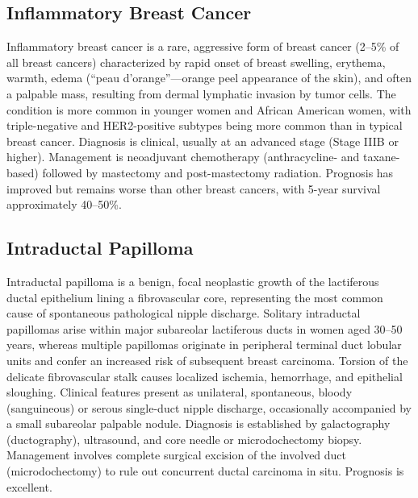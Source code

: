 \subsection{Inflammatory Breast Cancer}
\label{sec:Inflammatory Breast Cancer}
Inflammatory breast cancer is a rare, aggressive form of breast cancer (2--5\% of all breast cancers) characterized by rapid onset of breast swelling, erythema, warmth, edema (``peau d'orange''---orange peel appearance of the skin), and often a palpable mass, resulting from dermal lymphatic invasion by tumor cells. The condition is more common in younger women and African American women, with triple-negative and HER2-positive subtypes being more common than in typical breast cancer. Diagnosis is clinical, usually at an advanced stage (Stage IIIB or higher). Management is neoadjuvant chemotherapy (anthracycline- and taxane-based) followed by mastectomy and post-mastectomy radiation. Prognosis has improved but remains worse than other breast cancers, with 5-year survival approximately 40--50\%.

\subsection{Intraductal Papilloma}
\label{sec:Intraductal Papilloma}
Intraductal papilloma is a benign, focal neoplastic growth of the lactiferous ductal epithelium lining a fibrovascular core, representing the most common cause of spontaneous pathological nipple discharge. Solitary intraductal papillomas arise within major subareolar lactiferous ducts in women aged 30--50 years, whereas multiple papillomas originate in peripheral terminal duct lobular units and confer an increased risk of subsequent breast carcinoma. Torsion of the delicate fibrovascular stalk causes localized ischemia, hemorrhage, and epithelial sloughing. Clinical features present as unilateral, spontaneous, bloody (sanguineous) or serous single-duct nipple discharge, occasionally accompanied by a small subareolar palpable nodule. Diagnosis is established by galactography (ductography), ultrasound, and core needle or microdochectomy biopsy. Management involves complete surgical excision of the involved duct (microdochectomy) to rule out concurrent ductal carcinoma in situ. Prognosis is excellent.

